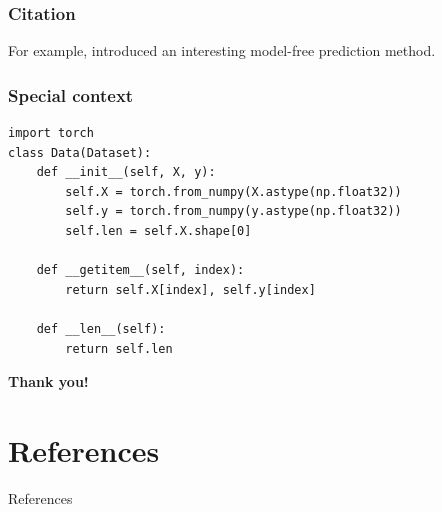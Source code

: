 \documentclass[aspectratio=169,xcolor=x11names]{beamer}
\begin{document}
\begin{frame}[fragile] 
    \frametitle{Citation}

    For example, \cite{politis2015model} introduced an interesting model-free prediction method.
\end{frame}



\begin{frame}[fragile] %
    \frametitle{Special context}
\begin{verbatim}
import torch
class Data(Dataset):
    def __init__(self, X, y):
        self.X = torch.from_numpy(X.astype(np.float32))
        self.y = torch.from_numpy(y.astype(np.float32))
        self.len = self.X.shape[0]
       
    def __getitem__(self, index):
        return self.X[index], self.y[index]
   
    def __len__(self):
        return self.len
\end{verbatim}
\end{frame}

\begin{frame}
\color{RoyalBlue4}
    \Huge{\centerline{\textbf{Thank you!}}}
\end{frame}


\section*{References}
\footnotesize
\begin{frame}{References}
        
        
\end{frame}



\end{document}
